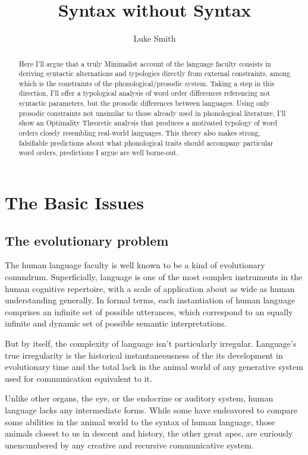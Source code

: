 \documentclass{article}
\title{Syntax without Syntax}
\author{Luke Smith}
\begin{document}
\maketitle

\begin{abstract}
Here I'll argue that a truly Minimalist account of the language faculty consists in deriving syntactic alternations and typologies directly from external constraints, among which is the constraints of the phonological/prosodic system. Taking a step in this direction, I'll offer a typological analysis of word order differences referencing not syntactic parameters, but the prosodic differences between languages. Using only prosodic constraints not unsimilar to those already used in phonological literature, I'll show an Optimality Theoretic analysis that produces a motivated typology of word orders closely resembling real-world languages. This theory also makes strong, falsifiable predictions about what phonological traits should accompany particular word orders, predictions I argue are well borne-out.
\end{abstract}

\section{The Basic Issues}

\subsection{The evolutionary problem}

The human language faculty is well known to be a kind of evolutionary conundrum. Superficially, language is one of the most complex instruments in the human cognitive repertoire, with a scale of application about as wide as human understanding generally. In formal terms, each instantiation of human language comprises an infinite set of possible utterances, which correspond to an equally infinite and dynamic set of possible semantic interpretations.

But by itself, the complexity of language isn't particularly irregular. Language's true irregularity is the historical instantaneousness of the its development in evolutionary time and the total lack in the animal world of any generative system used for communication equivalent to it.

Unlike other organs, the eye, or the endocrine or auditory system, human language lacks any intermediate forms. While some have endeavored to compare some abilities in the animal world to the syntax of human language, those animals closest to us in descent and history, the other great apes, are curiously unencumbered by any creative and recursive communicative system.
\end{document}
